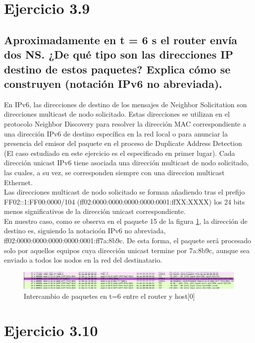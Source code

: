 \section{Ejercicio 3.9}
\subsection{ Aproximadamente en t = 6 s el router envía dos NS. ¿De qué tipo son las direcciones IP destino de estos
paquetes? Explica cómo se construyen (notación IPv6 no abreviada).}

En IPv6, las direcciones de destino de los mensajes de Neighbor Solicitation son direcciones multicast de nodo solicitado. Estas direcciones se utilizan en el protocolo Neighbor Discovery para resolver la dirección MAC correspondiente a una dirección IPv6 de destino específica en la red local o para anunciar la presencia del emisor del paquete en el proceso de Duplicate Address Detection (El caso estudiado en este ejercicio es el especificado en primer lugar). Cada dirección unicast IPv6 tiene asociada una dirección multicast de nodo solicitado, las cuales, a su vez, se corresponden siempre con una direccion multicast Ethernet.\\
Las direcciones multicast de nodo solicitado se forman añadiendo tras el prefijo \\
FF02::1:FF00:0000/104 (ff02:0000:0000:0000:0000:0001:ffXX:XXXX) los 24 bits menos significativos de la dirección unicast correspondiente. \\
En nuestro caso, como se observa en el paquete 15 de la figura \ref{fig:ns_from_router_to_host0}, la dirección de destino es, siguiendo la notacioón IPv6 no abreviada, 
ff02:0000:0000:0000:0000:0001:ff7a:8b9c. De esta forma, el paquete será procesado solo por aquellos equipos cuya dirección unicast termine por 7a:8b9c, aunque sea enviado a todos los nodos en la red del destinatario.

\begin{figure}[H]
    \centering
    \includegraphics[width=135mm, scale=0.75]{imaxes/ejercicio3_9_1.png}
    \caption{Intercambio de paquetes en t=6 entre el router y host[0]}
    \label{fig:ns_from_router_to_host0}
\end{figure}

\section{Ejercicio 3.10}
